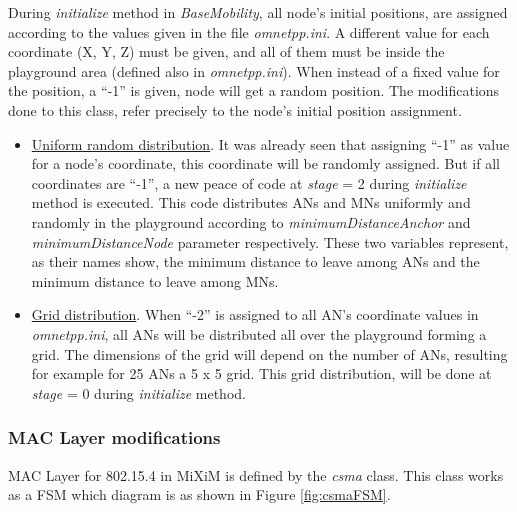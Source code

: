 During \textit{initialize} method in \textit{BaseMobility}, all node's initial positions, are assigned according to the values given in the file
\textit{omnetpp.ini}. A different value for each coordinate (X, Y, Z) must be given, and all of them must be inside the playground area (defined also
in \textit{omnetpp.ini}). When instead of a fixed value for the position, a ``-1'' is given, node will get a random position. The modifications done to
this class, refer precisely to the node's initial position assignment.

\begin{itemize}
 \item \underline{Uniform random distribution}. It was already seen that assigning ``-1'' as value for a node's coordinate, this coordinate will be 
randomly assigned. But if all coordinates are ``-1'', a new peace of code at \textit{stage} = 2 during \textit{initialize} method is executed. This 
code distributes \acp{AN} and \acp{MN} uniformly and randomly in the playground according to \textit{minimumDistanceAnchor} and 
\textit{minimumDistanceNode} parameter respectively. These two variables represent, as their names show, the minimum distance to leave among \acp{AN} 
and the minimum distance to leave among \acp{MN}.
 \item \underline{Grid distribution}. When ``-2'' is assigned to all \ac{AN}'s coordinate values in \textit{omnetpp.ini}, all \acp{AN} will be 
distributed all over the playground forming a grid. The dimensions of the grid will depend on the number of \acp{AN}, resulting for example for 25 
\acp{AN} a 5 x 5 grid. This grid distribution, will be done at \textit{stage} = 0 during \textit{initialize} method.
\end{itemize}

\subsubsection{\ac{MAC} Layer modifications}
\label{sec:macmodifications}

\ac{MAC} Layer for 802.15.4 in \ac{MiXiM} is defined by the \textit{csma} class. This class works as a \ac{FSM} which diagram is as shown in Figure 
\ref{fig:csmaFSM}.

